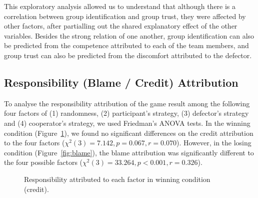 
This exploratory analysis allowed us to understand that although there is a correlation between group identification and group trust, they were affected by other factors, after partialling out the shared explanatory effect of the other variables. Besides the strong relation of one another, group identification can also be predicted from the competence attributed to each of the team members, and group trust can also be predicted from the discomfort attributed to the defector.

\subsection{Responsibility (Blame / Credit) Attribution}

To analyse the responsibility attribution of the game result among the following four factors of (1) randomness, (2) participant's strategy, (3) defector's strategy and (4) cooperator's strategy, we used Friedman's ANOVA tests. In the winning condition (Figure~\ref{fig:credit}), we found no significant differences on the credit attribution to the four factors ($\chi^2(3)=7.142, p=0.067, r=0.070$). However, in the losing condition (Figure~\ref{fig:blame}), the blame attribution was significantly different to the four possible factors ($\chi^2(3)=33.264, p<0.001, r=0.326$).



\begin{figure}[ht]
\centering

\caption{Responsibility attributed to each factor in winning condition (credit).}
\label{fig:credit}
\end{figure}

